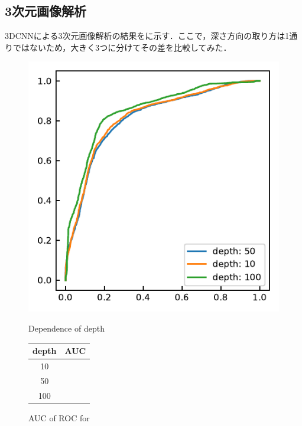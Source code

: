 \subsection{3次元画像解析}
3DCNNによる3次元画像解析の結果をに示す．ここで，深さ方向の取り方は1通りではないため，大きく3つに分けてその差を比較してみた．

\begin{figure}[H]
	\centering
	\begin{minipage}{0.4\columnwidth}
		\centering
		\includegraphics[width=\linewidth]{fig/chapter4/3d/roc/depth_all.pdf}
		\caption{Dependence of depth}
		\label{fig:depthall}
	\end{minipage}
	\makeatletter
	\def\@captype{table}
	\makeatother
	\begin{minipage}{0.4\columnwidth}
		\centering
		\caption{AUC of ROC for }
		\label{tab:2DCNNpreprocessing_AUC}
		\begin{tabular}{cc}\toprule
			depth & AUC \\ \midrule
			10 &  \\ 
			50 &  \\ 
			100 &  \\ \bottomrule
		\end{tabular} 
	\end{minipage}
\end{figure}

